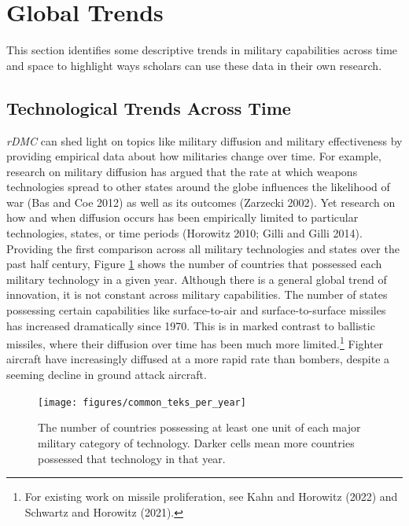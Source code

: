 \documentclass[
]{article}
\begin{document}
\hypertarget{global-trends}{%
\section{Global Trends}\label{global-trends}}

This section identifies some descriptive trends in military capabilities across time and space to highlight ways scholars can use these data in their own research.

\hypertarget{technological-trends-across-time}{%
\subsection{Technological Trends Across Time}\label{technological-trends-across-time}}

\emph{rDMC} can shed light on topics like military diffusion and military effectiveness by providing empirical data about how militaries change over time. For example, research on military diffusion has argued that the rate at which weapons technologies spread to other states around the globe influences the likelihood of war (Bas and Coe 2012) as well as its outcomes (Zarzecki 2002). Yet research on how and when diffusion occurs has been empirically limited to particular technologies, states, or time periods (Horowitz 2010; Gilli and Gilli 2014). Providing the first comparison across all military technologies and states over the past half century, Figure \ref{fig:common-teks} shows the number of countries that possessed each military technology in a given year. Although there is a general global trend of innovation, it is not constant across military capabilities. The number of states possessing certain capabilities like surface-to-air and surface-to-surface missiles has increased dramatically since 1970. This is in marked contrast to ballistic missiles, where their diffusion over time has been much more limited.\footnote{For existing work on missile proliferation, see Kahn and Horowitz (2022) and Schwartz and Horowitz (2021).} Fighter aircraft have increasingly diffused at a more rapid rate than bombers, despite a seeming decline in ground attack aircraft.

\begin{figure}
\texttt{[image: figures/common\_teks\_per\_year]} \caption{The number of countries possessing at least one unit of each major military category of technology. Darker cells mean more countries possessed that technology in that year.}\label{fig:common-teks}
\end{figure}
\end{document}
